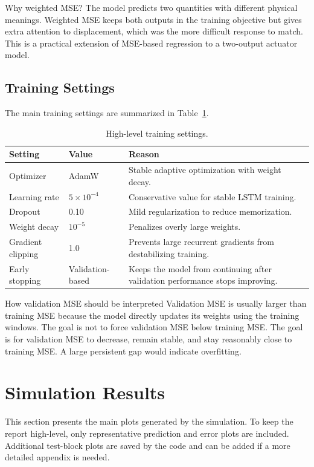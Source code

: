 \documentclass[11pt]{article}
\begin{document}
\begin{trainbox}{Why weighted MSE?}
The model predicts two quantities with different physical meanings. Weighted MSE keeps both outputs in the training objective but gives extra attention to displacement, which was the more difficult response to match. This is a practical extension of MSE-based regression to a two-output actuator model.
\end{trainbox}

\subsection{Training Settings}
The main training settings are summarized in Table~\ref{tab:training_summary}.

\begin{table}[H]
\centering
\small
\begin{tabular}{p{4cm}p{3cm}p{7cm}}
\toprule
Setting & Value & Reason \\
\midrule
Optimizer & AdamW & Stable adaptive optimization with weight decay. \\
Learning rate & $5\times10^{-4}$ & Conservative value for stable LSTM training. \\
Dropout & 0.10 & Mild regularization to reduce memorization. \\
Weight decay & $10^{-5}$ & Penalizes overly large weights. \\
Gradient clipping & 1.0 & Prevents large recurrent gradients from destabilizing training. \\
Early stopping & Validation-based & Keeps the model from continuing after validation performance stops improving. \\
\bottomrule
\end{tabular}
\caption{High-level training settings.}
\label{tab:training_summary}
\end{table}

\begin{cautionbox}{How validation MSE should be interpreted}
Validation MSE is usually larger than training MSE because the model directly updates its weights using the training windows. The goal is not to force validation MSE below training MSE. The goal is for validation MSE to decrease, remain stable, and stay reasonably close to training MSE. A large persistent gap would indicate overfitting.
\end{cautionbox}

\section{Simulation Results}
This section presents the main plots generated by the simulation. To keep the report high-level, only representative prediction and error plots are included. Additional test-block plots are saved by the code and can be added if a more detailed appendix is needed.
\end{document}
